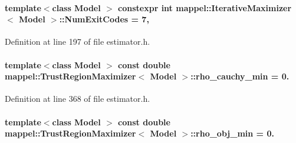 \paragraph[{\texorpdfstring{Num\+Exit\+Codes}{NumExitCodes}}]{\setlength{\rightskip}{0pt plus 5cm}template$<$class Model $>$ constexpr int {\bf mappel\+::\+Iterative\+Maximizer}$<$ Model $>$\+::Num\+Exit\+Codes = 7\hspace{0.3cm}{\ttfamily [static]}, {\ttfamily [inherited]}}\hypertarget{classmappel_1_1IterativeMaximizer_a04888d87aa205d54e7cae5a97d1c1e75}{}\label{classmappel_1_1IterativeMaximizer_a04888d87aa205d54e7cae5a97d1c1e75}


Definition at line 197 of file estimator.\+h.

\paragraph[{\texorpdfstring{rho\+\_\+cauchy\+\_\+min}{rho_cauchy_min}}]{\setlength{\rightskip}{0pt plus 5cm}template$<$class Model $>$ const double {\bf mappel\+::\+Trust\+Region\+Maximizer}$<$ Model $>$\+::rho\+\_\+cauchy\+\_\+min = 0.\hspace{0.3cm}{\ttfamily [static]}}\hypertarget{classmappel_1_1TrustRegionMaximizer_aff3b0746e84ccdcbeadeb92bf36fe63d}{}\label{classmappel_1_1TrustRegionMaximizer_aff3b0746e84ccdcbeadeb92bf36fe63d}


Definition at line 368 of file estimator.\+h.

\paragraph[{\texorpdfstring{rho\+\_\+obj\+\_\+min}{rho_obj_min}}]{\setlength{\rightskip}{0pt plus 5cm}template$<$class Model $>$ const double {\bf mappel\+::\+Trust\+Region\+Maximizer}$<$ Model $>$\+::rho\+\_\+obj\+\_\+min = 0.\hspace{0.3cm}{\ttfamily [static]}}\hypertarget{classmappel_1_1TrustRegionMaximizer_a2b483473663b4fd9f6c75dfbc19c4c3e}{}\label{classmappel_1_1TrustRegionMaximizer_a2b483473663b4fd9f6c75dfbc19c4c3e}


